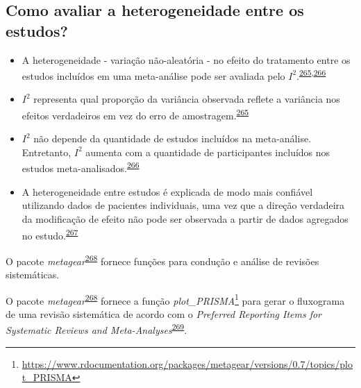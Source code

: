 \documentclass[
  a4paper,
]{book}
\renewcommand{\href}[2]{#2\footnote{\url{#1}}}
\newenvironment{infobox}[1]
  {
  \begin{itemize}
  \renewcommand{\labelitemi}{
    \raisebox{-.7\height}[0pt][0pt]{
      {\setkeys{Gin}{width=3em,keepaspectratio}
        \texttt{[image: \#1]}}
    }
  }
  \setlength{\fboxsep}{1em}
  \begin{blackbox}
  \item
  }
  {
  \end{blackbox}
  \end{itemize}
  }
\begin{document}
\hypertarget{como-avaliar-a-heterogeneidade-entre-os-estudos}{%
\subsection{Como avaliar a heterogeneidade entre os estudos?}\label{como-avaliar-a-heterogeneidade-entre-os-estudos}}

\begin{itemize}
\item
  A heterogeneidade - variação não-aleatória - no efeito do tratamento entre os estudos incluídos em uma meta-análise pode ser avaliada pelo \(I^{2}\).\textsuperscript{\protect\hyperlink{ref-Borenstein2022}{265},\protect\hyperlink{ref-Ruxfccker2008}{266}}
\item
  \(I^{2}\) representa qual proporção da variância observada reflete a variância nos efeitos verdadeiros em vez do erro de amostragem.\textsuperscript{\protect\hyperlink{ref-Borenstein2022}{265}}
\item
  \(I^{2}\) não depende da quantidade de estudos incluídos na meta-análise. Entretanto, \(I^{2}\) aumenta com a quantidade de participantes incluídos nos estudos meta-analisados.\textsuperscript{\protect\hyperlink{ref-Ruxfccker2008}{266}}
\item
  A heterogeneidade entre estudos é explicada de modo mais confiável utilizando dados de pacientes individuais, uma vez que a direção verdadeira da modificação de efeito não pode ser observada a partir de dados agregados no estudo.\textsuperscript{\protect\hyperlink{ref-degrooth2023}{267}}
\end{itemize}

\begin{infobox}{images/Rlogo}
O pacote \emph{metagear}\textsuperscript{\protect\hyperlink{ref-metagear}{268}} fornece funções para condução e análise de revisões sistemáticas.

\end{infobox}

\begin{infobox}{images/Rlogo}
O pacote \emph{metagear}\textsuperscript{\protect\hyperlink{ref-metagear}{268}} fornece a função \href{https://www.rdocumentation.org/packages/metagear/versions/0.7/topics/plot_PRISMA}{\emph{plot\_PRISMA}} para gerar o fluxograma de uma revisão sistemática de acordo com o \emph{Preferred Reporting Items for Systematic Reviews and Meta-Analyses}\textsuperscript{\protect\hyperlink{ref-Moher2015}{269}}.

\end{infobox}
\end{document}
